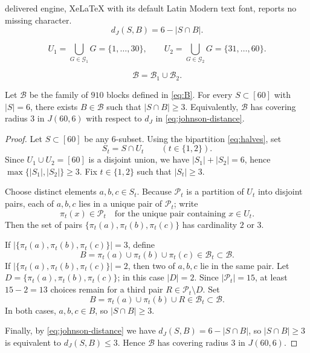 \documentclass[10pt,a4paper]{amsart}
\begin{document}
delivered engine, XeLaTeX with its default Latin Modern text font, reports no missing character.
\begin{equation}\label{eq:johnson-distance}
d_J(S,B)=6-|S\cap B|.
\end{equation}

\begin{equation}\label{eq:halves}
U_1=\bigcup_{G\in\mathcal{G}_1}G=\{1,\dots,30\},\qquad
U_2=\bigcup_{G\in\mathcal{G}_2}G=\{31,\dots,60\}.
\end{equation}

\begin{equation}\label{eq:B}
\mathcal{B}=\mathcal{B}_1\cup \mathcal{B}_2.
\end{equation}

\begin{theorem}\label{thm:main}
Let $\mathcal{B}$ be the family of $910$ blocks defined in \eqref{eq:B}.
For every $S\subset[60]$ with $|S|=6$, there exists $B\in\mathcal{B}$ such that $|S\cap B|\ge 3$.
Equivalently, $\mathcal{B}$ has covering radius $3$ in $J(60,6)$ with respect to $d_J$ in \eqref{eq:johnson-distance}.
\end{theorem}

\begin{proof}
Let $S\subset[60]$ be any $6$-subset. Using the bipartition \eqref{eq:halves}, set
\[
S_t=S\cap U_t\qquad (t\in\{1,2\}).
\]
Since $U_1\cup U_2=[60]$ is a disjoint union, we have $|S_1|+|S_2|=6$, hence
$\max\{|S_1|,|S_2|\}\ge 3$. Fix $t\in\{1,2\}$ such that $|S_t|\ge 3$.

Choose distinct elements $a,b,c\in S_t$. Because $\mathcal{P}_t$ is a partition of $U_t$ into disjoint pairs,
each of $a,b,c$ lies in a unique pair of $\mathcal{P}_t$; write
\[
\pi_t(x)\in\mathcal{P}_t\quad\text{for the unique pair containing }x\in U_t.
\]
Then the set of pairs $\{\pi_t(a),\pi_t(b),\pi_t(c)\}$ has cardinality $2$ or $3$.

If $|\{\pi_t(a),\pi_t(b),\pi_t(c)\}|=3$, define
\[
B=\pi_t(a)\cup \pi_t(b)\cup \pi_t(c)\in\mathcal{B}_t\subset\mathcal{B}.
\]
If $|\{\pi_t(a),\pi_t(b),\pi_t(c)\}|=2$, then two of $a,b,c$ lie in the same pair.
Let $D=\{\pi_t(a),\pi_t(b),\pi_t(c)\}$; in this case $|D|=2$.
Since $|\mathcal{P}_t|=15$, at least $15-2=13$ choices remain for a third pair $R\in\mathcal{P}_t\setminus D$.
Set
\[
B=\pi_t(a)\cup \pi_t(b)\cup R\in\mathcal{B}_t\subset\mathcal{B}.
\]
In both cases, $a,b,c\in B$, so $|S\cap B|\ge 3$.

Finally, by \eqref{eq:johnson-distance} we have $d_J(S,B)=6-|S\cap B|$, so $|S\cap B|\ge 3$
is equivalent to $d_J(S,B)\le 3$. Hence $\mathcal{B}$ has covering radius $3$ in $J(60,6)$.
\end{proof}
\end{document}
